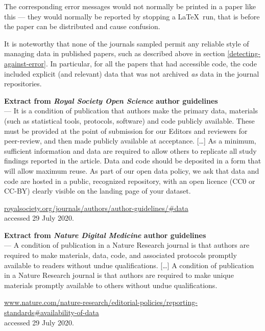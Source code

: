 \documentclass{article}
\begin{document}
The corresponding error messages would not normally be printed in a paper like this --- they would normally be reported by stopping a \LaTeX\ run, that is before the paper can be distributed and cause confusion.


It is noteworthy that none of the journals sampled permit any reliable style of managing data in published papers, such as described above in section \ref{detecting-against-error}. In particular, for all the papers that had accessible code, the code included explicit (and relevant) data that was not archived \emph{as\/} data in the journal repositories.
\\

{\sf
\noindent\textbf{Extract from \emph{Royal Society Open Science\/} author guidelines} \\
--- It is a condition of publication that authors make the primary data, materials (such as statistical tools, protocols, software) and code publicly available. These must be provided at the point of submission for our Editors and reviewers for peer-review, and then made publicly available at acceptance. [\ldots] As a minimum, sufficient information and data are required to allow others to replicate all study findings reported in the article. Data and code should be deposited in a form that will allow maximum reuse. As part of our open data policy, we ask that data and code are hosted in a public, recognized repository, with an open licence (CC0 or CC-BY) clearly visible on the landing page of your dataset.

\vskip 3mm
{\raggedleft\scriptsize
\url{royalsociety.org/journals/authors/author-guidelines/#data} \\
accessed 29 July 2020.\par
}

\noindent\textbf{Extract from \emph{Nature Digital Medicine\/} author guidelines}\\
--- A condition of publication in a Nature Research journal is that authors are required to make materials, data, code, and associated protocols promptly available to readers without undue qualifications. [\ldots] A condition of publication in a Nature Research journal is that authors are required to make unique materials promptly available to others without undue qualifications. 

{\vskip 3mm\scriptsize
\raggedleft
\url{www.nature.com/nature-research/editorial-policies/reporting-standards#availability-of-data} \\
accessed 29 July 2020.\par
}

}
\end{document}
